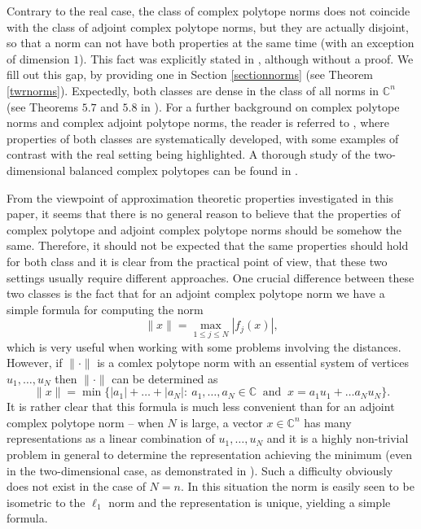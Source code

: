 \documentclass[12pt, reqno]{amsart}
\theoremstyle{definition}
\theoremstyle{remark}
\numberwithin{equation}{section}
\begin{document}
Contrary to the real case, the class of complex polytope norms does not coincide with the class of adjoint complex polytope norms, but they are actually disjoint, so that a norm can not have both properties at the same time (with an exception of dimension $1$). This fact was explicitly stated in \cite{complexpolytope}, although without a proof. We fill out this gap, by providing one in Section \ref{sectionnorms} (see Theorem \ref{twrnorms}). Expectedly, both classes are dense in the class of all norms in $\mathbb{C}^n$ (see Theorems $5.7$ and $5.8$ in \cite{complexpolytope}). For a further background on complex polytope norms and complex adjoint polytope norms, the reader is referred to \cite{complexpolytope}, where properties of both classes are systematically developed, with some examples of contrast with the real setting being highlighted. A thorough study of the two-dimensional balanced complex polytopes can be found in \cite{complexpolytope2dim}.

From the viewpoint of approximation theoretic properties investigated in this paper, it seems that there is no general reason to believe that the properties of complex polytope and adjoint complex polytope norms should be somehow the same. Therefore, it should not be expected that the same properties should hold for both class and it is clear from the practical point of view, that these two settings usually require different approaches. One crucial difference between these two classes is the fact that for an adjoint complex polytope norm we have a simple formula for computing the norm
$$\|x\| = \max_{1 \leq j \leq N} |f_j(x)|,$$
which is very useful when working with some problems involving the distances. However, if $\| \cdot \|$ is a comlex polytope norm with an essential system of vertices $u_1, \ldots, u_N$ then $\| \cdot \|$ can be determined as
$$\|x\| = \min\{|a_1| + \ldots + |a_N|: \  a_1, \ldots, a_N \in \mathbb{C} \ \text{ and } \  x = a_1u_1 + \ldots a_Nu_N\}.$$
It is rather clear that this formula is much less convenient than for an adjoint complex polytope norm -- when $N$ is large, a vector $x \in \mathbb{C}^n$ has many representations as a linear combination of $u_1, \ldots, u_N$ and it is a highly non-trivial problem in general to determine the representation achieving the minimum (even in the two-dimensional case, as demonstrated in \cite{complexpolytope2dim}). Such a difficulty obviously does not exist in the case of $N=n$. In this situation the norm is easily seen to be isometric to the $\ell_1$ norm and the representation is unique, yielding a simple formula. 
\end{document}

